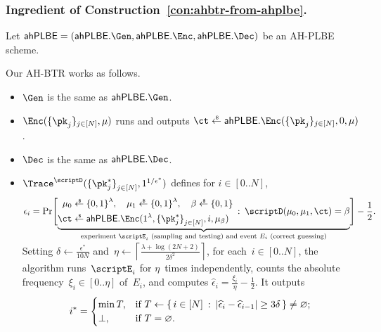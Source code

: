 \subsubsection{Ingredient of Construction~\ref{con:ahbtr-from-ahplbe}.}
Let
${\AHPLBE=(\AHPLBE.\Gen},\allowbreak\AHPLBE.\Enc,\allowbreak\AHPLBE.\Dec)$
be an AH-PLBE scheme.

\begin{construction}\label{con:ahbtr-from-ahplbe}
Our AH-BTR works as follows.
\begin{itemize}
\item $\Gen$ is the same as $\AHPLBE.\Gen$.
\item $\Enc(\{\pk_j\}_{j\in[N]},\mu)$ runs and outputs
${\ct\draws\AHPLBE.\Enc(\{\pk_j\}_{j\in[N]},0,\mu)}$.
\item $\Dec$ is the same as $\AHPLBE.\Dec$.
\item $\Trace^\scriptD(\{\pk^\ast_j\}_{j\in[N]}^\sphantom,1^{1/\epsilon^\ast})$
defines
for ${i\in[0..N]}$,
\begin{align*}
\WideNarrow{}{\hspace*{-1em}}
\epsilon_i=\Pr\Biggl[\smash{\underbrace{
\begin{aligned}
\mu_0&{}\draws\bit^\lambda,\quad
\mu_1\draws\bit^\lambda,\quad
\beta\draws\bit\\
\ct&{}\draws\AHPLBE.\Enc(1^\lambda,\{\pk^\ast_j\}_{j\in[N]}^\sphantom,i,\mu_\beta)
\end{aligned}
\::\:
\scriptD(\mu_0,\mu_1,\ct)=\beta
}_{\textup{experiment }\scriptE_i\textup{ (sampling and testing) and event }E_i\textup{ (correct guessing)}}}
\Biggr]-\frac12.
\vphantom{\underbrace{\begin{aligned}0\\0\end{aligned}}_{0}}
\end{align*}
Setting ${\delta\gets\frac{\epsilon^\ast}{10N}}$
and~${\eta\gets\left\lceil\frac{\lambda+\log({2N+2})}{2\delta^2}\right\rceil}$,
for each~${i\in[0..N]}$,
the algorithm runs~$\scriptE_i$ for $\eta$~times independently,
counts the absolute frequency~${\xi_i\in[0..\eta]}$ of~$E_i$, and
computes ${\widehat{\epsilon}_i=\frac{\xi_i}{\eta}-\frac12}$.
It outputs
\begin{align*}
i^\ast=\begin{cases}
\min T,&\textup{if }T\gets
\{\,
{i\in[N]}
\::\:
{|\widehat{\epsilon}_i-\widehat{\epsilon}_{i-1}|\geq 3\delta}
\,\}
\neq\varnothing;\\
\bot,&\textup{if }T=\varnothing.
\end{cases}
\end{align*}
\end{itemize}
\end{construction}

